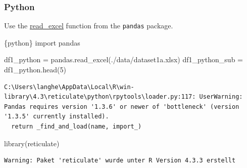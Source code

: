 \documentclass[
  letterpaper,
  DIV=11,
  numbers=noendperiod,
  oneside]{scrreprt}
\newenvironment{Shaded}{\begin{snugshade}}{\end{snugshade}}
\newcommand{\DecValTok}[1]{\textcolor[rgb]{0.68,0.00,0.00}{#1}}
\newcommand{\FunctionTok}[1]{\textcolor[rgb]{0.28,0.35,0.67}{#1}}
\newcommand{\ImportTok}[1]{\textcolor[rgb]{0.00,0.46,0.62}{#1}}
\newcommand{\InformationTok}[1]{\textcolor[rgb]{0.37,0.37,0.37}{#1}}
\newcommand{\NormalTok}[1]{\textcolor[rgb]{0.00,0.23,0.31}{#1}}
\newcommand{\OperatorTok}[1]{\textcolor[rgb]{0.37,0.37,0.37}{#1}}
\newcommand{\SpecialCharTok}[1]{\textcolor[rgb]{0.37,0.37,0.37}{#1}}
\newcommand{\StringTok}[1]{\textcolor[rgb]{0.13,0.47,0.30}{#1}}
\begin{document}
\subsubsection{Python}

Use the
\href{https://pandas.pydata.org/docs/reference/api/pandas.read_excel.html}{read\_excel}
function from the \texttt{pandas} package.

\begin{Shaded}
\begin{Highlighting}[]
\InformationTok{\textasciigrave{}\textasciigrave{}\textasciigrave{}\{python\}}
\ImportTok{import}\NormalTok{ pandas}

\NormalTok{df1\_python }\OperatorTok{=}\NormalTok{ pandas.read\_excel(}\StringTok{\textquotesingle{}./data/dataset1a.xlsx\textquotesingle{}}\NormalTok{)}
\NormalTok{df1\_python\_sub }\OperatorTok{=}\NormalTok{ df1\_python.head(}\DecValTok{5}\NormalTok{)}
\InformationTok{\textasciigrave{}\textasciigrave{}\textasciigrave{}}
\end{Highlighting}
\end{Shaded}

\begin{verbatim}
C:\Users\langhe\AppData\Local\R\win-library\4.3\reticulate\python\rpytools\loader.py:117: UserWarning: Pandas requires version '1.3.6' or newer of 'bottleneck' (version '1.3.5' currently installed).
  return _find_and_load(name, import_)
\end{verbatim}

\begin{Shaded}
\begin{Highlighting}[]
\FunctionTok{library}\NormalTok{(reticulate)}
\end{Highlighting}
\end{Shaded}

\begin{verbatim}
Warning: Paket 'reticulate' wurde unter R Version 4.3.3 erstellt
\end{verbatim}

\begin{Shaded}
\end{Shaded}
\end{document}
